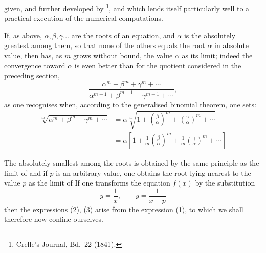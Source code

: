 given, and further developed by \footnote{Crelle's Journal, Bd.~22 (1841).}, and which lends itself particularly well to a practical execution of the numerical computations.

If, as above, $\alpha, \beta, \gamma \ldots$ are the roots of an equation, and $\alpha$ is the absolutely greatest among them, so that none of the others equals the root $\alpha$ in absolute value, then
has, as $m$ grows without bound, the value $\alpha$ as its limit; indeed the convergence toward $\alpha$ is even better than for the quotient considered in the preceding section,
\[
\frac{\alpha^m + \beta^m + \gamma^m + \cdots}{\alpha^{m-1} + \beta^{m-1} + \gamma^{m-1} + \cdots},
\]
as one recognises when, according to the generalised binomial theorem, one sets:
\[
\begin{aligned}
\sqrt[m]{\alpha^m + \beta^m + \gamma^m + \cdots} &= \alpha\sqrt[m]{1 + \left(\frac{\beta}{\alpha}\right)^m + \left(\frac{\gamma}{\alpha}\right)^m + \cdots} \\
&= \alpha\left[1 + \frac{1}{m}\left(\frac{\beta}{\alpha}\right)^m + \frac{1}{m}\left(\frac{\gamma}{\alpha}\right)^m + \cdots\right]
\end{aligned}
\]

The absolutely smallest among the roots is obtained by the same principle as the limit of
and if $p$ is an arbitrary value, one obtains the root lying nearest to the value $p$ as the limit of
If one transforms the equation $f(x)$ by the substitution
\[
y = \frac{1}{x}, \qquad y = \frac{1}{x - p}
\]
then the expressions (2), (3) arise from the expression (1), to which we shall therefore now confine ourselves.
